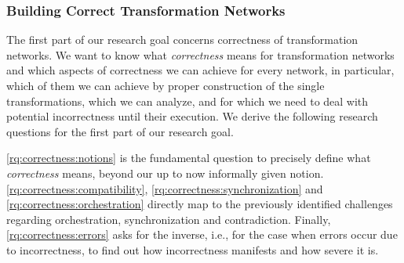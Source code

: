 

\subsubsection*{Building Correct Transformation Networks} %

The first part of our research goal concerns correctness of transformation networks.
We want to know what \emph{correctness} means for transformation networks and which aspects of correctness we can achieve for every network, in particular, which of them we can achieve by proper construction of the single transformations, which we can analyze, and for which we need to deal with potential incorrectness until their execution.
We derive the following research questions for the first part of our research goal.

\begin{researchquestions}
	\begin{subresearchquestions}
	\end{subresearchquestions}
\end{researchquestions}

\autoref{rq:correctness:notions} is the fundamental question to precisely define what \emph{correctness} means, beyond our up to now informally given notion.
\autoref{rq:correctness:compatibility}, \autoref{rq:correctness:synchronization} and \autoref{rq:correctness:orchestration} directly map to the previously identified challenges regarding orchestration, synchronization and contradiction.
Finally, \autoref{rq:correctness:errors} asks for the inverse, i.e., for the case when errors occur due to incorrectness, to find out how incorrectness manifests and how severe it is.


